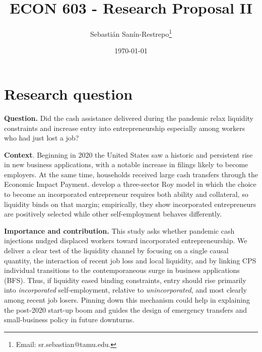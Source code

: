 



\title{\Large \textbf{ECON 603 - Research Proposal II}}

\author{Sebasti\'an San\'in-Restrepo\thanks{Email: sr.sebastian@tamu.edu.}} 
\date{\today}

\maketitle
\thispagestyle{empty} 
\doublespacing
\thispagestyle{empty} 

\vspace{-10mm}

\doublespacing

\section{ Research question}

\noindent \textbf{Question.} Did the cash assistance delivered during the pandemic relax liquidity constraints and increase entry into entrepreneurship especially among workers who had just lost a job?


\medskip
\noindent
\textbf{Context}. Beginning in 2020 the United States saw a historic and persistent rise in new business applications, with a notable increase in filings likely to become employers. At the same time, households received large cash transfers through the Economic Impact Payment. \cite{levineSelectionEntrepreneurshipSelfEmployment2018} develop a three-sector Roy model in which the choice to become an incorporated entrepreneur requires both ability and collateral, so liquidity binds on that margin; empirically, they show incorporated entrepreneurs are positively selected while other self-employment behaves differently. 

\noindent \textbf{Importance and contribution.} This study asks whether pandemic cash injections nudged displaced workers toward incorporated entrepreneurship. We deliver a clear test of the liquidity channel by focusing on a single causal quantity, the interaction of recent job loss and local liquidity, and by linking CPS individual transitions to the contemporaneous surge in business applications (BFS). Thus, if liquidity eased binding constraints, entry should rise primarily into \textit{incorporated} self-employment, relative to \textit{unincorporated}, and most clearly among recent job losers. Pinning down this mechanism could help in explaining the post-2020 start-up boom and guides the design of emergency transfers and small-business policy in future downturns.

